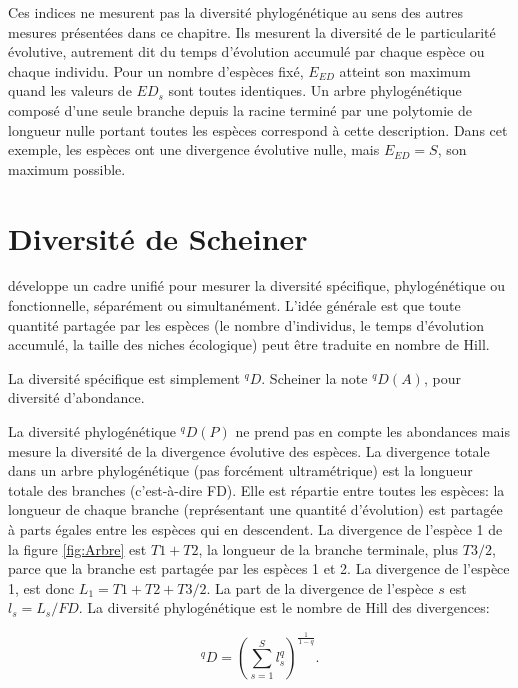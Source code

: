 \documentclass[
  11pt,
  french,
  a4paper,
  extrafontsizes,onecolumn,openright
  ]{memoir}
\begin{document}
Ces indices ne mesurent pas la diversité phylogénétique au sens des autres mesures présentées dans ce chapitre.
Ils mesurent la diversité de le particularité évolutive, autrement dit du temps d'évolution accumulé par chaque espèce ou chaque individu.
Pour un nombre d'espèces fixé, \(E_{\mathit{ED}}\) atteint son maximum quand les valeurs de \(\mathit{ED}_s\) sont toutes identiques.
Un arbre phylogénétique composé d'une seule branche depuis la racine terminé par une polytomie de longueur nulle portant toutes les espèces correspond à cette description.
Dans cet exemple, les espèces ont une divergence évolutive nulle, mais \(E_{\mathit{ED}} = S\), son maximum possible.

\hypertarget{diversituxe9-de-scheiner}{%
\section{Diversité de Scheiner}\label{diversituxe9-de-scheiner}}

\textcite{Scheiner2012} développe un cadre unifié pour mesurer la diversité spécifique, phylogénétique ou fonctionnelle, séparément ou simultanément.
L'idée générale est que toute quantité partagée par les espèces (le nombre d'individus, le temps d'évolution accumulé, la taille des niches écologique) peut être traduite en nombre de Hill.

La diversité spécifique est simplement \(^{q}\!D\). Scheiner la note \(^{q}\!D(A)\), pour diversité d'abondance.

La diversité phylogénétique \(^{q}\!D(P)\) ne prend pas en compte les abondances mais mesure la diversité de la divergence évolutive des espèces.
La divergence totale dans un arbre phylogénétique (pas forcément ultramétrique) est la longueur totale des branches (c'est-à-dire FD).
Elle est répartie entre toutes les espèces: la longueur de chaque branche (représentant une quantité d'évolution) est partagée à parts égales entre les espèces qui en descendent.
La divergence de l'espèce 1 de la figure \ref{fig:Arbre} est \(T1+T2\), la longueur de la branche terminale, plus \({T3}/{2}\), parce que la branche est partagée par les espèces 1 et 2.
La divergence de l'espèce 1, est donc \(L_1 = T1+T2+{T3}/{2}\).
La part de la divergence de l'espèce \(s\) est \(l_s = {L_s}/{FD}\).
La diversité phylogénétique est le nombre de Hill des divergences:

\begin{equation}
  \label{eq:HillDivergences}
  ^{q}\!D = {\left(\sum^S_{s=1}{l_s^q}\right)}^{\frac{1}{1-q}}.
\end{equation}
\end{document}
